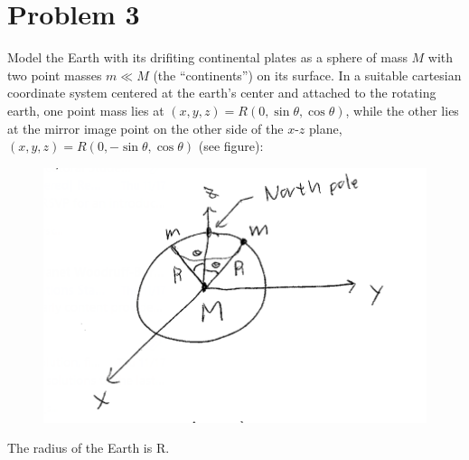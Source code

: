 \documentclass[12pt]{article}
\begin{document}
\section*{Problem 3}
Model the Earth with its drifiting continental plates as a sphere of mass $M$ with two point masses $m \ll M$ (the ``continents'') on its surface. In a suitable cartesian coordinate system centered at the earth's center and attached to the rotating earth, one point mass lies at $(x,y,z)=R(0,\sin\theta,\cos\theta)$, while the other lies at the mirror image point on the other side of the $x$-$z$ plane, $(x,y,z)=R(0,-\sin\theta,\cos\theta)$ (see figure):
\begin{figure}[H]
    \includegraphics{Problem3}
    \centering
\end{figure}
The radius of the Earth is R.
\end{document}

